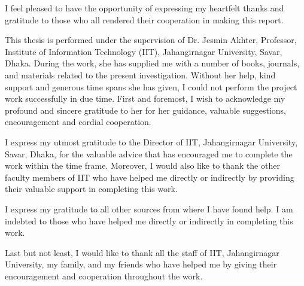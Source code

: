 I feel pleased to have the opportunity of expressing my heartfelt thanks and gratitude to those who all rendered their cooperation in making this report.

This thesis is performed under the supervision of Dr. Jesmin Akhter, Professor, Institute of Information Technology (IIT), Jahangirnagar University, Savar, Dhaka. During the work, she has supplied me with a number of books, journals, and materials related to the present investigation. Without her help, kind support and generous time spans she has given, I could not perform the project work successfully in due time. First and foremost, I wish to acknowledge my profound and sincere gratitude to her for her guidance, valuable suggestions, encouragement and cordial cooperation.

I express my utmost gratitude to the Director of IIT, Jahangirnagar University, Savar, Dhaka, for the valuable advice that has encouraged me to complete the work within the time frame. Moreover, I would also like to thank the other faculty members of IIT who have helped me directly or indirectly by providing their valuable support in completing this work.

I express my gratitude to all other sources from where I have found help. I am indebted to those who have helped me directly or indirectly in completing this work.

Last but not least, I would like to thank all the staff of IIT, Jahangirnagar University, my family, and my friends who have helped me by giving their encouragement and cooperation throughout the work.